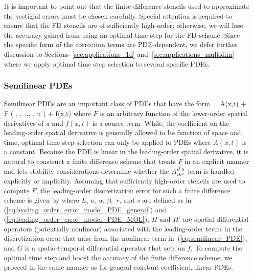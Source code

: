 \documentclass[oneeqnum,onefignum,onetabnum,onethmnum]{siamltex}
\begin{document}
It is important to point out that the finite difference stencils used to 
approximate the vestigial errors must be chosen carefully.  Special attention 
is required to ensure that the FD stencils are of sufficiently high-order; 
otherwise, we will lose the accuracy gained from using an optimal time step 
for the FD scheme.  Since the specific form of the correction terms are 
PDE-dependent, we defer further discussion to 
Sections~\ref{sec:applications_1d} and~\ref{sec:applications_multidim} where 
we apply optimal time step selection to several specific PDEs.


\subsubsection*{Semilinear PDEs}
Semilinear PDEs are an important class of PDEs that have the form
\beq
   = A(x,t) 
  + F \left( ,
      , \ldots,
      , u \right)
  + f(x,t)
  \label{eq:semilinear_PDE}
\eeq
where $F$ is an arbitrary function of the lower-order spatial derivatives
of $u$ and $f(x,t)$ is a source term.  While, the coefficient on the 
leading-order spatial derivative is generally allowed to be function of 
space and time, optimal time step selection can only be applied to PDEs where
$A(x,t)$ is a constant.  Because the PDE is linear in the leading-order 
spatial derivative, it is natural to construct a finite difference scheme that 
treats $F$ in an explicit manner and lets stability considerations determine 
whether the $A \frac{\partial^n u}{\partial x^n}$ term is handled explicitly 
or implicitly.  Assuming that sufficiently high-order stencils are used to 
compute $F$, the leading-order discretization error for such a finite 
difference scheme is given by
\bea
  \dt {}
  \label{eq:leading_order_error_semilinear_PDE_MOL}
\eea
where $L$, $u$, $\alpha$, $\beta,$ $r$, and $s$ are defined as in
(\ref{eq:leading_order_error_model_PDE_general}) and
(\ref{eq:leading_order_error_model_PDE_MOL}), $H$ and $H'$ are spatial 
differential operators (potentially nonlinear) associated with the 
leading-order terms in the discretization error that arise from the nonlinear 
term in~(\ref{eq:semilinear_PDE}), and $G$ is a spatio-temporal differential 
operator that acts on $f$.  To compute the optimal time step and boost
the accuracy of the finite difference scheme, we proceed in the
same manner as for general constant coefficient, linear PDEs.
\end{document}
